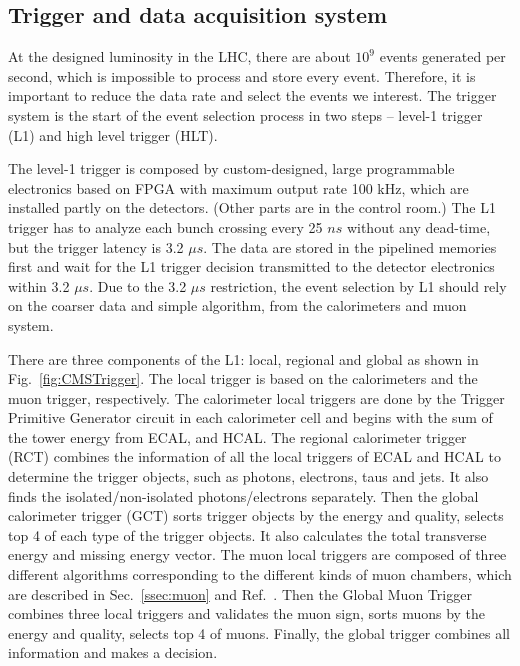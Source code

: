\subsection{Trigger and data acquisition system}

At the designed luminosity in the LHC, there are about $10^{9}$ events generated per second, 
which is impossible to process and store every event. Therefore, it is important to reduce the data rate and select the events we interest.
The trigger system is the start of the event selection process in two steps -- level-1 trigger (L1) and high level trigger (HLT).

The level-1 trigger is composed by custom-designed, large programmable electronics based on FPGA with maximum output rate 100 kHz, which are installed partly on the detectors. (Other parts are in the control room.)
The L1 trigger has to analyze each bunch crossing every 25 $ns$ without any dead-time, but the trigger latency is 3.2 $\mu$$s$.
The data are stored in the pipelined memories first and wait for the L1 trigger decision transmitted to the detector electronics within 3.2 $\mu$$s$.
Due to the 3.2 $\mu$$s$ restriction, the event selection by L1 should rely on the coarser data and simple algorithm, from the calorimeters and muon system.

There are three components of the L1: local, regional and global as shown in Fig.~\ref{fig:CMSTrigger}.
The local trigger is based on the calorimeters and the muon trigger, respectively.	
The calorimeter local triggers are done by the Trigger Primitive Generator circuit in each calorimeter cell and begins with the sum of the tower energy from ECAL, and HCAL.
The regional calorimeter trigger (RCT) combines the information of all the local triggers of ECAL and HCAL to determine the trigger objects, such as photons, electrons, taus and jets.
It also finds the isolated/non-isolated photons/electrons separately.
Then the global calorimeter trigger (GCT) sorts trigger objects by the energy and quality, selects top 4 of each type of the trigger objects.
It also calculates the total transverse energy and missing energy vector.
The muon local triggers are composed of three different algorithms corresponding to the different kinds of muon chambers, which are described in Sec.~\ref{ssec:muon} and Ref.~\cite{Bayatyan:706847}.
Then the Global Muon Trigger combines three local triggers and validates the muon sign, sorts muons by the energy and quality, selects top 4 of muons.
Finally, the global trigger combines all information and makes a decision.

